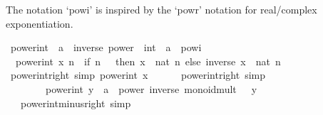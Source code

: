 \begin{isabellebody}
\begin{isamarkuptext}
  The notation `powi' is inspired by the `powr' notation for real/complex exponentiation.%
\end{isamarkuptext}\isamarkuptrue%
\isamarkupfalse%
\ power{\isacharunderscore}{\kern0pt}int\ {\isacharcolon}{\kern0pt}{\isacharcolon}{\kern0pt}\ {\isachardoublequoteopen}{\isacharprime}{\kern0pt}a\ {\isacharcolon}{\kern0pt}{\isacharcolon}{\kern0pt}\ {\isacharbraceleft}{\kern0pt}inverse{\isacharcomma}{\kern0pt}\ power{\isacharbraceright}{\kern0pt}\ {\isasymRightarrow}\ int\ {\isasymRightarrow}\ {\isacharprime}{\kern0pt}a{\isachardoublequoteclose}\ {\isacharparenleft}{\kern0pt}\ {\isachardoublequoteopen}powi{\isachardoublequoteclose}\ {}{}{\isacharparenright}{\kern0pt}\ \isanewline
\ \ {\isachardoublequoteopen}power{\isacharunderscore}{\kern0pt}int\ x\ n\ {\isacharequal}{\kern0pt}\ {\isacharparenleft}{\kern0pt}if\ n\ {\isasymge}\ {}\ then\ x\ {\isacharcircum}{\kern0pt}\ nat\ n\ else\ inverse\ x\ {\isacharcircum}{\kern0pt}\ {\isacharparenleft}{\kern0pt}nat\ {\isacharparenleft}{\kern0pt}{\isacharminus}{\kern0pt}n{\isacharparenright}{\kern0pt}{\isacharparenright}{\kern0pt}{\isacharparenright}{\kern0pt}{\isachardoublequoteclose}\isanewline
\isanewline
{}\isamarkupfalse%
\ power{\isacharunderscore}{\kern0pt}int{\isacharunderscore}{\kern0pt}{}{\isacharunderscore}{\kern0pt}right\ {\isacharbrackleft}{\kern0pt}simp{\isacharbrackright}{\kern0pt}{\isacharcolon}{\kern0pt}\ {\isachardoublequoteopen}power{\isacharunderscore}{\kern0pt}int\ x\ {}\ {\isacharequal}{\kern0pt}\ {}{\isachardoublequoteclose}\isanewline
\ \ \ power{\isacharunderscore}{\kern0pt}int{\isacharunderscore}{\kern0pt}{}{\isacharunderscore}{\kern0pt}right\ {\isacharbrackleft}{\kern0pt}simp{\isacharbrackright}{\kern0pt}{\isacharcolon}{\kern0pt}\isanewline
\ \ \ \ \ \ \ \ {\isachardoublequoteopen}power{\isacharunderscore}{\kern0pt}int\ {\isacharparenleft}{\kern0pt}y\ {\isacharcolon}{\kern0pt}{\isacharcolon}{\kern0pt}\ {\isacharprime}{\kern0pt}a\ {\isacharcolon}{\kern0pt}{\isacharcolon}{\kern0pt}\ {\isacharbraceleft}{\kern0pt}power{\isacharcomma}{\kern0pt}\ inverse{\isacharcomma}{\kern0pt}\ monoid{\isacharunderscore}{\kern0pt}mult{\isacharbraceright}{\kern0pt}{\isacharparenright}{\kern0pt}\ {}\ {\isacharequal}{\kern0pt}\ y{\isachardoublequoteclose}\isanewline
\ \ \ power{\isacharunderscore}{\kern0pt}int{\isacharunderscore}{\kern0pt}minus{}{\isacharunderscore}{\kern0pt}right\ {\isacharbrackleft}{\kern0pt}simp{\isacharbrackright}{\kern0pt}{\isacharcolon}{\kern0pt}\isanewline

\end{isabellebody}
